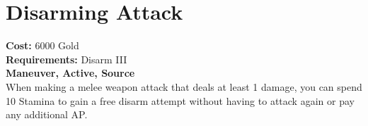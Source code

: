 \section*{Disarming Attack}
\textbf{Cost:} 6000 Gold\\
\textbf{Requirements:} Disarm III\\
\textbf{Maneuver, Active, Source}\\
When making a melee weapon attack that deals at least 1 damage, you can spend 10 Stamina to gain a free disarm attempt without having to attack again or pay any additional AP.\\
